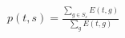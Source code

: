 \documentclass[border=3pt]{standalone}
\begin{document}
$\displaystyle p(t,s) = \frac{\sum_{g \in S_s} E(t,g)}{\sum_{g} E(t,g)}$
\end{document}
